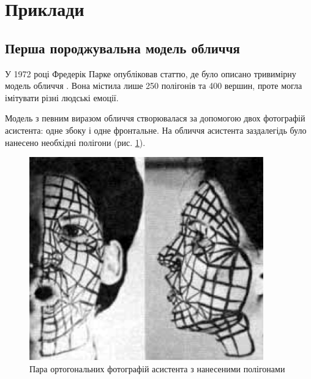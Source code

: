 \section{Приклади}

\vspace{-\baselineskip}

\subsection{Перша породжувальна модель обличчя}

У 1972 році Фредерік Парке опубліковав статтю,
де було описано тривимірну модель обличчя \cite{Parke:1972}.
Вона містила лише 250 полігонів та 400 вершин,
проте могла імітувати різні людські емоції.

Модель з певним виразом обличчя створювалася за допомогою
двох фотографій асистента: одне збоку і одне фронтальне.
На обличчя асистента заздалегідь було нанесено необхідні полігони
(рис. \ref{fig:parke:face-paint}).
\begin{figure}[h]
  \centering
    \includegraphics[width=0.9\textwidth]{images/Parke-face-paint}
  \caption{Пара ортогональних фотографій асистента з нанесеними полігонами}
  \label{fig:parke:face-paint}
\end{figure}

